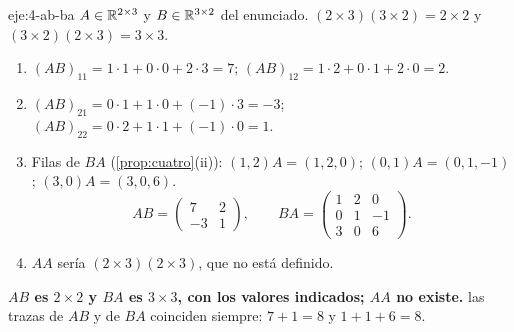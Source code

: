 \begin{solucion}{eje:4-ab-ba}
\datos $A\in\mathbb{R}^{2\times 3}$ y $B\in\mathbb{R}^{3\times 2}$ del enunciado.
\planteamiento $(2\times 3)(3\times 2)=2\times 2$ y $(3\times 2)(2\times 3)=3\times 3$.
\pasos
\begin{enumerate}[label=\arabic*.]
  \item $(AB)_{11}=1\cdot 1+0\cdot 0+2\cdot 3=7$; $(AB)_{12}=1\cdot 2+0\cdot 1+2\cdot 0=2$.
  \item $(AB)_{21}=0\cdot 1+1\cdot 0+(-1)\cdot 3=-3$; $(AB)_{22}=0\cdot 2+1\cdot 1+(-1)\cdot 0=1$.
  \item Filas de $BA$ (\cref{prop:cuatro}(ii)): $(1,2)A=(1,2,0)$; $(0,1)A=(0,1,-1)$; $(3,0)A=(3,0,6)$.
  \[
  AB=\begin{pmatrix}7&2\\-3&1\end{pmatrix},\qquad BA=\begin{pmatrix}1&2&0\\0&1&-1\\3&0&6\end{pmatrix}.
  \]
  \item $AA$ sería $(2\times 3)(2\times 3)$, que no está definido.
\end{enumerate}
\resultado \textbf{$AB$ es $2\times 2$ y $BA$ es $3\times 3$, con los valores indicados; $AA$ no existe.}
\comprobacion las trazas de $AB$ y de $BA$ coinciden siempre: $7+1=8$ y $1+1+6=8$.
\end{solucion}

